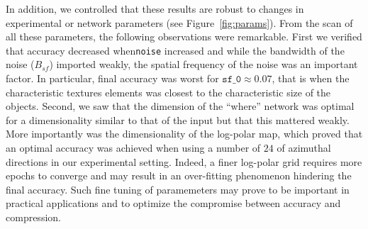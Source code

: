 In addition, we controlled that these results are robust to changes in experimental or network parameters (see Figure~\ref{fig:params}). From the scan of all these parameters, the following observations were remarkable. First we verified that accuracy decreased when\texttt{noise} increased and while the bandwidth of the noise ($B_{sf}$) imported weakly, the spatial frequency of the noise was an important factor. In particular, final accuracy was worst for $\texttt{sf\_0} \approx 0.07$, that is when the characteristic textures elements was closest to the characteristic size of the objects. Second, we saw that the dimension of the ``where'' network was optimal for a dimensionality similar to that of the input but that this mattered weakly. More importantly was the dimensionality of the log-polar map, which proved that an optimal accuracy was achieved when using a number of $24$ of azimuthal directions in our experimental setting. Indeed, a finer log-polar grid requires more epochs to converge and may result in an over-fitting phenomenon hindering the final accuracy. Such fine tuning of paramemeters may prove to be important in practical applications and to optimize the compromise between accuracy and compression. 
